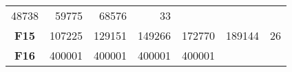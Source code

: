 \documentclass[12pt,a4paper]{article}
\begin{document}
\begin{longtable}[c]{@{}crrrrrr@{}}
\begin{minipage}[t]{0.09\columnwidth}
48738
\strut\end{minipage} &
\begin{minipage}[t]{0.10\columnwidth}\raggedleft\strut
59775
\strut\end{minipage} &
\begin{minipage}[t]{0.11\columnwidth}\raggedleft\strut
68576
\strut\end{minipage} &
\begin{minipage}[t]{0.07\columnwidth}\raggedleft\strut
33
\strut\end{minipage}\tabularnewline
\begin{minipage}[t]{0.11\columnwidth}\centering\strut
\textbf{F15}
\strut\end{minipage} &
\begin{minipage}[t]{0.08\columnwidth}\raggedleft\strut
107225
\strut\end{minipage} &
\begin{minipage}[t]{0.08\columnwidth}\raggedleft\strut
129151
\strut\end{minipage} &
\begin{minipage}[t]{0.09\columnwidth}\raggedleft\strut
149266
\strut\end{minipage} &
\begin{minipage}[t]{0.10\columnwidth}\raggedleft\strut
172770
\strut\end{minipage} &
\begin{minipage}[t]{0.11\columnwidth}\raggedleft\strut
189144
\strut\end{minipage} &
\begin{minipage}[t]{0.07\columnwidth}\raggedleft\strut
26
\strut\end{minipage}\tabularnewline
\begin{minipage}[t]{0.11\columnwidth}\centering\strut
\textbf{F16}
\strut\end{minipage} &
\begin{minipage}[t]{0.08\columnwidth}\raggedleft\strut
400001
\strut\end{minipage} &
\begin{minipage}[t]{0.08\columnwidth}\raggedleft\strut
400001
\strut\end{minipage} &
\begin{minipage}[t]{0.09\columnwidth}\raggedleft\strut
400001
\strut\end{minipage} &
\begin{minipage}[t]{0.10\columnwidth}\raggedleft\strut
400001
\strut\end{minipage} &
\begin{minipage}[t]{0.11\columnwidth}\raggedleft\strut

\end{minipage}
\end{longtable}
\end{document}
